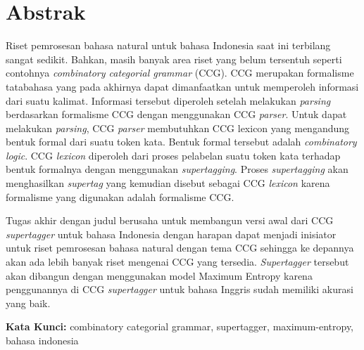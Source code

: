 \chapter*{Abstrak}

Riset pemrosesan bahasa natural untuk bahasa Indonesia saat ini terbilang sangat sedikit.
Bahkan, masih banyak area riset yang belum tersentuh seperti contohnya
\textit{combinatory categorial grammar} (CCG).
CCG merupakan formalisme tatabahasa yang pada akhirnya dapat dimanfaatkan untuk memperoleh informasi
dari suatu kalimat.
Informasi tersebut diperoleh setelah melakukan \textit{parsing} berdasarkan formalisme CCG dengan
menggunakan CCG \textit{parser}.
Untuk dapat melakukan \textit{parsing}, CCG \textit{parser} membutuhkan CCG lexicon yang mengandung
bentuk formal dari suatu token kata.
Bentuk formal tersebut adalah \textit{combinatory logic}.
CCG \textit{lexicon} diperoleh dari proses pelabelan suatu token kata terhadap bentuk formalnya dengan
menggunakan \textit{supertagging}.
Proses \textit{supertagging} akan menghasilkan \textit{supertag} yang kemudian disebut sebagai CCG
\textit{lexicon} karena formalisme yang digunakan adalah formalisme CCG.

Tugas akhir dengan judul \textbf{\Title} berusaha untuk membangun versi awal dari CCG
\textit{supertagger} untuk bahasa Indonesia dengan harapan dapat menjadi inisiator untuk riset
pemrosesan bahasa natural dengan tema CCG sehingga ke depannya akan ada lebih banyak riset
mengenai CCG yang tersedia.
\textit{Supertagger} tersebut akan dibangun dengan menggunakan model Maximum Entropy karena
penggunannya di CCG \textit{supertagger} untuk bahasa Inggris sudah memiliki akurasi yang baik.


\vspace{0.5 cm}
\begin{flushleft}
{\textbf{Kata Kunci:}
  combinatory categorial grammar, supertagger, maximum-entropy, bahasa indonesia
}
\end{flushleft}
